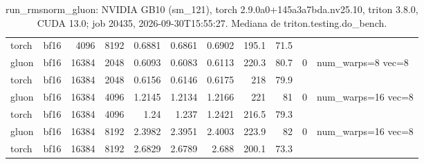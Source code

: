 \begin{table}[htbp]
\begin{tabular}{llrrrrrrrll}
    torch & bf16 & 4096 & 8192 & 0.6881 & 0.6861 & 0.6902 & 195.1 & 71.5 &  &  \\
    gluon & bf16 & 16384 & 2048 & 0.6093 & 0.6083 & 0.6113 & 220.3 & 80.7 & 0 & num\_warps=8 vec=8 \\
    torch & bf16 & 16384 & 2048 & 0.6156 & 0.6146 & 0.6175 & 218 & 79.9 &  &  \\
    gluon & bf16 & 16384 & 4096 & 1.2145 & 1.2134 & 1.2166 & 221 & 81 & 0 & num\_warps=16 vec=8 \\
    torch & bf16 & 16384 & 4096 & 1.24 & 1.237 & 1.2421 & 216.5 & 79.3 &  &  \\
    gluon & bf16 & 16384 & 8192 & 2.3982 & 2.3951 & 2.4003 & 223.9 & 82 & 0 & num\_warps=16 vec=8 \\
    torch & bf16 & 16384 & 8192 & 2.6829 & 2.6789 & 2.688 & 200.1 & 73.3 &  &  \\
    \bottomrule
  \end{tabular}
  \caption{run\_rmsnorm\_gluon: NVIDIA GB10 (sm\_121), torch 2.9.0a0+145a3a7bda.nv25.10, triton 3.8.0, CUDA 13.0; job 20435, 2026-09-30T15:55:27. Mediana de triton.testing.do\_bench.}
  \label{tab:patterson-run-rmsnorm-gluon}
\end{table}
